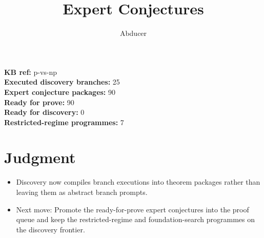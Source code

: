\documentclass[11pt]{article}
\title{Expert Conjectures}
\author{Abducer}
\date{}
\begin{document}
\maketitle

\noindent
\textbf{KB ref:} p-vs-np\\
\textbf{Executed discovery branches:} 25\\
\textbf{Expert conjecture packages:} 90\\
\textbf{Ready for prove:} 90\\
\textbf{Ready for discovery:} 0\\
\textbf{Restricted-regime programmes:} 7

\section*{Judgment}
\begin{itemize}
\item Discovery now compiles branch executions into theorem packages rather than leaving them as abstract branch prompts.
\item Next move: Promote the ready-for-prove expert conjectures into the proof queue and keep the restricted-regime and foundation-search programmes on the discovery frontier.
\end{itemize}
\end{document}
